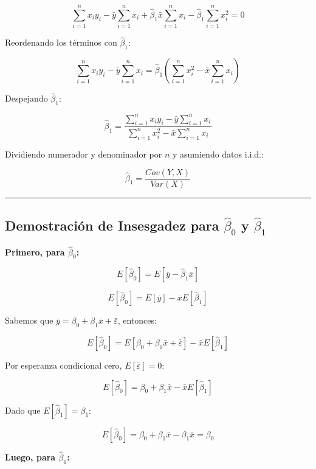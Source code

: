 \documentclass[
]{book}
\begin{document}
\[
\sum_{i=1}^{n} x_i y_i - \bar{y} \sum_{i=1}^{n} x_i + \hat{\beta}_1\bar{x} \sum_{i=1}^{n} x_i - \hat{\beta}_1 \sum_{i=1}^{n} x_i^2 = 0
\]

Reordenando los términos con \(\hat{\beta}_1\):

\[
\sum_{i=1}^{n} x_i y_i - \bar{y} \sum_{i=1}^{n} x_i = \hat{\beta}_1 \left( \sum_{i=1}^{n} x_i^2 - \bar{x} \sum_{i=1}^{n} x_i \right)
\]

Despejando \(\hat{\beta}_1\):

\[
\hat{\beta}_1 = \frac{\sum_{i=1}^{n} x_i y_i - \bar{y} \sum_{i=1}^{n} x_i}{\sum_{i=1}^{n} x_i^2 - \bar{x} \sum_{i=1}^{n} x_i}
\]

Dividiendo numerador y denominador por \(n\) y asumiendo datos i.i.d.:

\[
\hat{\beta}_1 = \frac{Cov(Y,X)}{Var(X)}
\]

\begin{center}\rule{0.5\linewidth}{0.5pt}\end{center}

\subsection{\texorpdfstring{Demostración de Insesgadez para \(\hat{\beta}_0\) y \(\hat{\beta}_1\)}{Demostración de Insesgadez para \textbackslash hat\{\textbackslash beta\}\_0 y \textbackslash hat\{\textbackslash beta\}\_1}}\label{demostraciuxf3n-de-insesgadez-para-hatbeta_0-y-hatbeta_1}

\textbf{Primero, para \(\hat{\beta}_0\):}

\[
E[\hat{\beta}_0] = E[\bar{y} - \hat{\beta}_1\bar{x}]
\]

\[
E[\hat{\beta}_0] = E[\bar{y}] - \bar{x}E[\hat{\beta}_1]
\]

Sabemos que \(\bar{y} = \beta_0 + \beta_1\bar{x} + \bar{\varepsilon}\), entonces:

\[
E[\hat{\beta}_0] = E[\beta_0 + \beta_1\bar{x} + \bar{\varepsilon}] - \bar{x}E[\hat{\beta}_1]
\]

Por esperanza condicional cero, \(E[\bar{\varepsilon}] = 0\):

\[
E[\hat{\beta}_0] = \beta_0 + \beta_1\bar{x} - \bar{x}E[\hat{\beta}_1]
\]

Dado que \(E[\hat{\beta}_1] = \beta_1\):

\[
E[\hat{\beta}_0] = \beta_0 + \beta_1\bar{x} - \beta_1\bar{x} = \beta_0
\]

\textbf{Luego, para \(\hat{\beta}_1\):}
\end{document}
